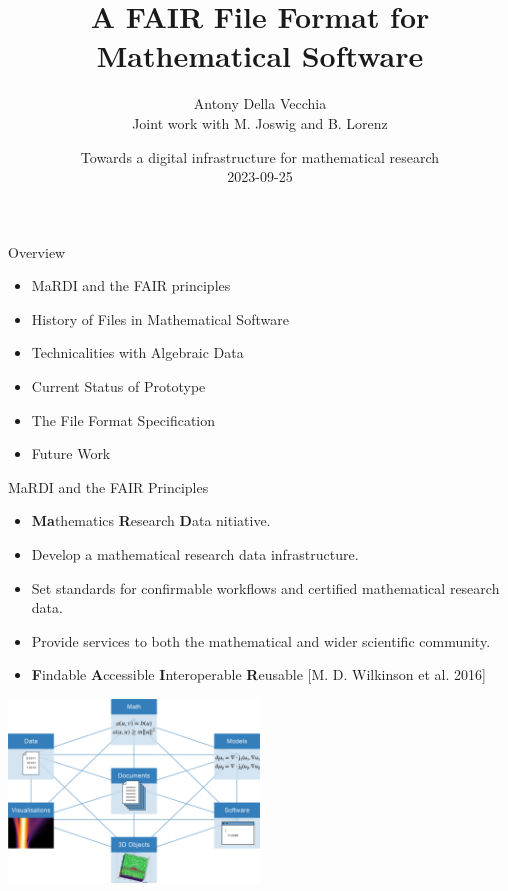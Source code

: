 \documentclass[9pt]{beamer}
\author[Antony Della Vecchia]{Antony Della Vecchia \\ \vspace{4mm} \small{Joint work with M. Joswig and B. Lorenz} }
\title{A FAIR File Format for Mathematical Software}
\institute[]{
Technische Universit\"at Berlin
}
\date{
  Towards a digital infrastructure for mathematical research \\
  2023-09-25
}
\theoremstyle{definition}
\begin{document}
\maketitle

\begin{frame}[fragile]{Overview}
  \begin{itemize}
  \item MaRDI and the FAIR principles
  \item History of Files in Mathematical Software
  \item Technicalities with Algebraic Data
  \item Current Status of Prototype
  \item The File Format Specification
  \item Future Work
  \end{itemize}
\end{frame}



\begin{frame}[fragile]{MaRDI and the FAIR Principles}
  \begin{itemize}
  \item \textbf{Ma}thematics \textbf{R}esearch \textbf{D}ata nitiative.
  \item Develop a mathematical research data infrastructure.
  \item Set standards for confirmable workflows and certified mathematical research data.
  \item Provide services to both the mathematical and wider scientific community.
  \item \textbf{F}indable \textbf{A}ccessible \textbf{I}nteroperable \textbf{R}eusable [M. D. Wilkinson et al. 2016]

  \end{itemize}
  \begin{center}
    \includegraphics[width=0.5\textwidth, height=0.5\textheight]{images/graph}
  \end{center}
\end{frame}
\end{document}
